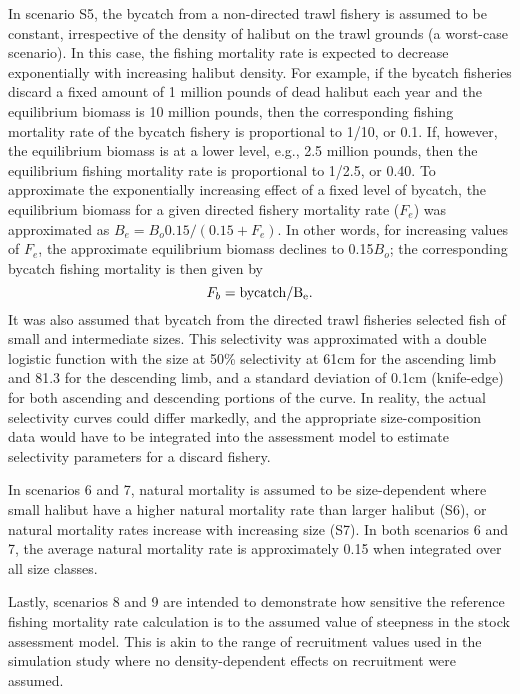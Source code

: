 In scenario S5, the bycatch from a non-directed trawl fishery is assumed to be constant, irrespective of the density of halibut on the trawl grounds (a worst-case scenario).  In this case, the fishing mortality rate is expected to decrease exponentially with increasing halibut density.  For example, if the bycatch fisheries discard a fixed amount of  1 million pounds of dead halibut each year and the equilibrium biomass is 10 million pounds, then the corresponding fishing mortality rate of the bycatch fishery is proportional to 1/10, or 0.1.  If, however, the equilibrium biomass is at a lower level, e.g., 2.5 million pounds, then the equilibrium fishing mortality rate is proportional to 1/2.5, or 0.40.  To approximate the exponentially increasing effect of a fixed level of bycatch, the equilibrium biomass for a given directed fishery mortality rate ($F_e$) was approximated as $B_e = B_o 0.15/(0.15+F_e)$.  In other words, for increasing values of $F_e$, the approximate equilibrium biomass declines to 0.15$B_o$; the corresponding bycatch fishing mortality is then given by \[F_b = \rm{bycatch}/B_e.\]  It was also assumed that bycatch from the directed trawl fisheries selected fish of small and intermediate sizes.  This selectivity was approximated with a double logistic function with the size at 50\% selectivity at 61cm for the ascending limb and 81.3 for the descending limb, and a standard deviation of 0.1cm (knife-edge) for both ascending and descending portions of the curve.  In reality, the actual selectivity curves could differ markedly, and the appropriate size-composition data would have to be integrated into the assessment model to estimate  selectivity parameters for a discard fishery.

In scenarios 6 and 7, natural mortality is assumed to be size-dependent where small halibut have a higher natural mortality rate than larger halibut (S6), or natural mortality rates increase with increasing size (S7).  In both scenarios 6 and 7, the average natural mortality rate is approximately 0.15 when integrated over all size classes.

Lastly, scenarios 8 and 9 are intended to demonstrate how sensitive the reference fishing mortality rate calculation is to the assumed value of steepness in the stock assessment model.  This is akin to the range of recruitment values used in the \cite{clark2006assessment} simulation study where no density-dependent effects on recruitment were assumed.


